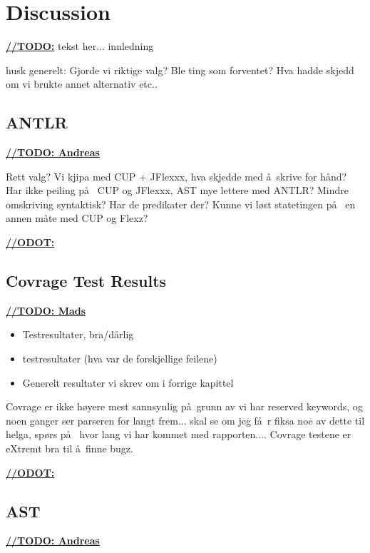 \chapter{Discussion}
\underline{\textbf{\LARGE //TODO:}} tekst her... innledning


husk generelt: Gjorde vi riktige valg? Ble ting som forventet? Hva hadde skjedd om vi brukte annet alternativ etc..








\section{ANTLR}
\underline{\textbf{\LARGE //TODO: Andreas}}

Rett valg?
Vi kjipa med CUP + JFlexxx, hva skjedde med \aa~skrive for h\aa nd?
Har ikke peiling p\aa~ CUP og JFlexxx, AST mye lettere med ANTLR? Mindre omskriving syntaktisk? Har de predikater der? Kunne vi l\o st statetingen p\aa~ en annen m\aa te med CUP og Flexz? 

\underline{\textbf{\LARGE //ODOT:}}




\section{Covrage Test Results}

\underline{\textbf{\LARGE //TODO: Mads}}
\begin{itemize}
\item Testresultater, bra/d\aa rlig
\item testresultater (hva var de forskjellige feilene)
\item Generelt resultater vi skrev om i forrige kapittel
\end{itemize}

Covrage er ikke h\o yere mest sannsynlig p\aa~grunn av vi har reserved keywords, og noen ganger ser parseren for langt frem... skal se om jeg f\aa~r fiksa noe av dette til helga, sp\o rs p\aa~ hvor lang vi har kommet med rapporten.... Covrage testene er eXtremt bra til \aa~finne bugz.

\underline{\textbf{\LARGE //ODOT:}}

\section{AST}
\underline{\textbf{\LARGE //TODO: Andreas}}

